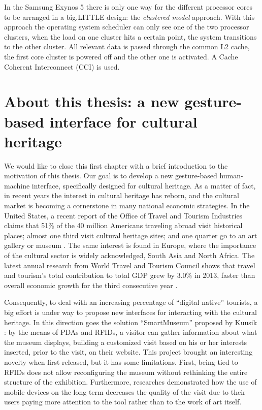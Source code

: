 In the Samsung Exynos 5 there is only one way for the different processor cores to be arranged in a big.LITTLE design: the \textit{clustered model} approach. With this approach the operating system scheduler can only see one of the two processor clusters, when the load on one cluster hits a certain point, the system transitions to the other cluster. All relevant data is passed through the common L2 cache, the first core cluster is powered off and the other one is activated. A Cache Coherent Interconnect (CCI) is used.


\section{About this thesis: a new gesture-based interface for cultural heritage}
We would like to close this first chapter with a brief introduction to the motivation of this thesis. Our goal is to develop a new gesture-based human-machine interface, specifically designed for cultural heritage. As a matter of fact, in recent years the interest in cultural heritage has reborn, and the cultural market is becoming a cornerstone in many national economic strategies. In the United States, a recent report of the Office of Travel and Tourism Industries claims that 51\% of the 40 million Americans traveling abroad visit historical places; almost one third visit cultural heritage sites; and one quarter go to an art gallery or museum \cite{tourismintelligence}. The same interest is found in Europe, where the importance of the cultural sector is widely acknowledged, South Asia and North Africa. The latest annual research from World Travel and Tourism Council shows that travel and tourism's total contribution to total GDP grew by 3.0\% in 2013, faster than overall economic growth for the third consecutive year \cite{econotravel}.

Consequently, to deal with an increasing percentage of ``digital native'' tourists, a big effort is under way to propose new interfaces for interacting with the cultural heritage.
 In this direction goes the solution ``SmartMuseum'' proposed by Kuusik \etal \cite{kuusik2009smartmuseum}: by the means of PDAs and RFIDs, a visitor can gather information about what the museum displays, building a customized visit based on his or her interests inserted, prior to the visit, on their website. This project brought an interesting novelty when first released, but it has some limitations. First, being tied to RFIDs does not allow reconfiguring the museum without rethinking the entire structure of the exhibition. Furthermore, researches demonstrated how the use of mobile devices on the long term decreases the quality of the visit due to their users paying more attention to the tool rather than to the work of art itself.

